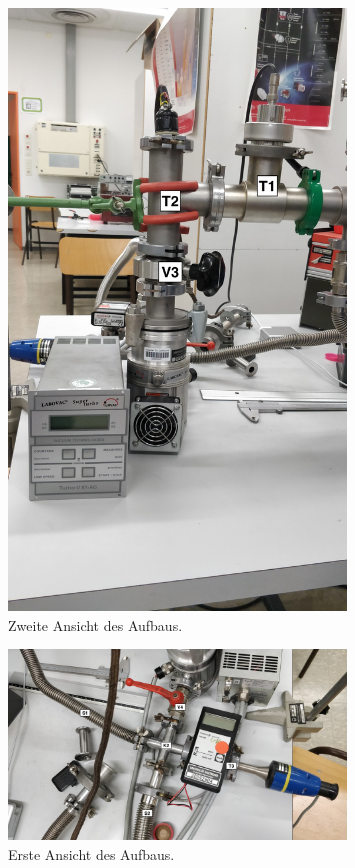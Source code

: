 \begin{figure}
	\centering
	\includegraphics[width=0.8\textwidth]{img/Aufbau2.jpg}
	\caption{Zweite Ansicht des Aufbaus.}
	\label{img:ab2}
\end{figure}
\begin{figure}
	\centering
	\includegraphics[width=0.8\textwidth]{img/Aufbau3.jpg}
	\caption{Erste Ansicht des Aufbaus.}
	\label{img:ab3}
\end{figure}
